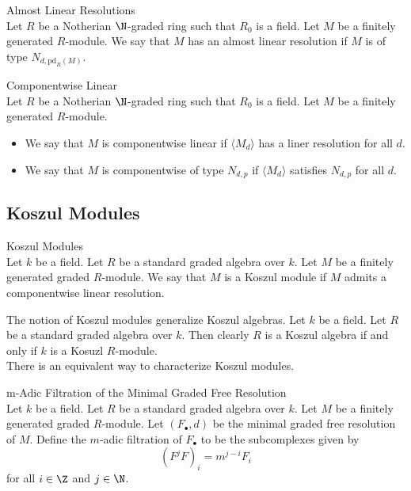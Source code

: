 \documentclass[a4paper]{article}
\begin{document}
\begin{defn}{Almost Linear Resolutions}{}\\
Let $R$ be a Notherian $\N$-graded ring such that $R_0$ is a field. Let $M$ be a finitely generated $R$-module. We say that $M$ has an almost linear resolution if $M$ is of type $N_{d,\text{pd}_R(M)}$. 
\end{defn}

\begin{defn}{Componentwise Linear}{}\\
Let $R$ be a Notherian $\N$-graded ring such that $R_0$ is a field. Let $M$ be a finitely generated $R$-module. 
\begin{itemize}
\item We say that $M$ is componentwise linear if $\langle M_d\rangle$ has a liner resolution for all $d$. 
\item We say that $M$ is componentwise of type $N_{d,p}$ if $\langle M_d\rangle$ satisfies $N_{d,p}$ for all $d$. 
\end{itemize}
\end{defn}

\subsection{Koszul Modules}
\begin{defn}{Koszul Modules}{}\\
Let $k$ be a field. Let $R$ be a standard graded algebra over $k$. Let $M$ be a finitely generated graded $R$-module. We say that $M$ is a Koszul module if $M$ admits a componentwise linear resolution. 
\end{defn}

The notion of Koszul modules generalize Koszul algebras. Let $k$ be a field. Let $R$ be a standard graded algebra over $k$. Then clearly $R$ is a Koszul algebra if and only if $k$ is a Kosuzl $R$-module. \\

There is an equivalent way to characterize Koszul modules. 

\begin{defn}{m-Adic Filtration of the Minimal Graded Free Resolution}{}\\
Let $k$ be a field. Let $R$ be a standard graded algebra over $k$. Let $M$ be a finitely generated graded $R$-module. Let $(F_\bullet,d)$ be the minimal graded free resolution of $M$. Define the $m$-adic filtration of $F_\bullet$ to be the subcomplexes given by $$(F^jF)_i=m^{j-i}F_i$$ for all $i\in\Z$ and $j\in\N$. 
\end{defn}
\end{document}
